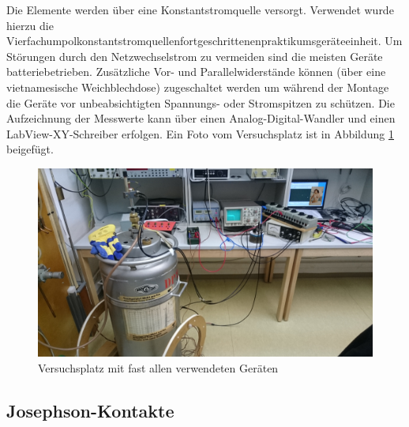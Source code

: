 		Die Elemente werden über eine Konstantstromquelle versorgt.
		Verwendet wurde hierzu die Vierfachumpolkonstantstromquellenfortgeschrittenenpraktikumsgeräteeinheit.
		Um Störungen durch den Netzwechselstrom zu vermeiden sind die meisten Geräte batteriebetrieben.
		Zusätzliche Vor- und Parallelwiderstände können (über eine vietnamesische Weichblechdose) zugeschaltet werden um während der Montage die Geräte vor unbeabsichtigten Spannungs- oder Stromspitzen zu schützen.
		Die Aufzeichnung der Messwerte kann über einen Analog-Digital-Wandler und einen LabView-XY-Schreiber erfolgen.
		Ein Foto vom Versuchsplatz ist in Abbildung \ref{platz} beigefügt.
		\begin{figure}[H]
			\center
			\includegraphics[scale=0.08]{messwerte/DSC_0631_booble_blazer_2.JPG}
			\caption{Versuchsplatz mit fast allen verwendeten Geräten}
			\label{platz}
		\end{figure}



	\subsection{Josephson-Kontakte} %
	\label{sub:josephson_kontakte}


